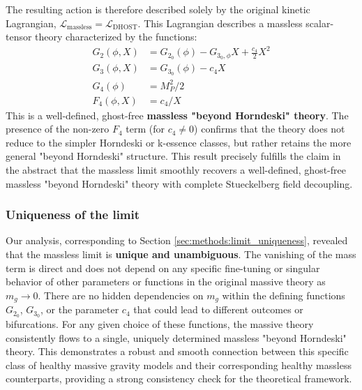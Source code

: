 \documentclass[twocolumn]{aastex631}
\begin{document}
The resulting action is therefore described solely by the original kinetic Lagrangian, $\mathcal{L}_{\text{massless}} = \mathcal{L}_{\text{DHOST}}$. This Lagrangian describes a massless scalar-tensor theory characterized by the functions:
\begin{align*}
G_2(\phi, X) &= G_{2_0}(\phi) - G_{3_0,\phi} X + \frac{c_4}{2} X^2 \\
G_3(\phi, X) &= G_{3_0}(\phi) - c_4 X \\
G_4(\phi) &= M_P^2 / 2 \\
F_4(\phi, X) &= c_4 / X
\end{align*}
This is a well-defined, ghost-free \textbf{massless "beyond Horndeski" theory}. The presence of the non-zero $F_4$ term (for $c_4 \neq 0$) confirms that the theory does not reduce to the simpler Horndeski or k-essence classes, but rather retains the more general "beyond Horndeski" structure. This result precisely fulfills the claim in the abstract that the massless limit smoothly recovers a well-defined, ghost-free massless "beyond Horndeski" theory with complete Stueckelberg field decoupling.

\subsubsection{Uniqueness of the limit}
Our analysis, corresponding to Section \ref{sec:methods:limit_uniqueness}, revealed that the massless limit is \textbf{unique and unambiguous}. The vanishing of the mass term is direct and does not depend on any specific fine-tuning or singular behavior of other parameters or functions in the original massive theory as $m_g \to 0$. There are no hidden dependencies on $m_g$ within the defining functions $G_{2_0}$, $G_{3_0}$, or the parameter $c_4$ that could lead to different outcomes or bifurcations. For any given choice of these functions, the massive theory consistently flows to a single, uniquely determined massless "beyond Horndeski" theory. This demonstrates a robust and smooth connection between this specific class of healthy massive gravity models and their corresponding healthy massless counterparts, providing a strong consistency check for the theoretical framework.
\end{document}
